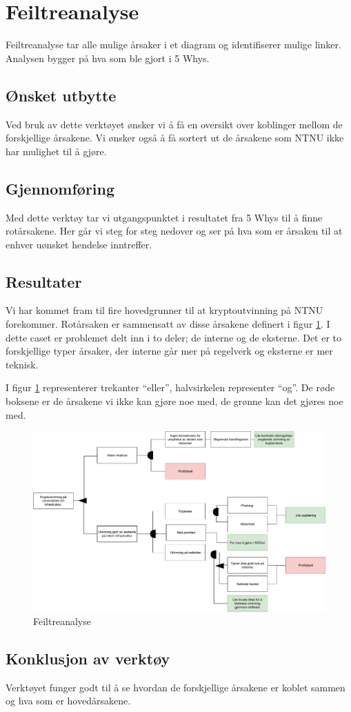 \section{Feiltreanalyse}
Feiltreanalyse tar alle mulige årsaker i et diagram og identifiserer mulige linker. Analysen bygger på hva som ble gjort i 5 Whys. 

\subsection{Ønsket utbytte}
Ved bruk av dette verktøyet ønsker vi å få en oversikt over koblinger mellom de forskjellige årsakene. Vi ønsker også å få sortert ut de årsakene som NTNU ikke har mulighet til å gjøre.

\subsection{Gjennomføring}
Med dette verktøy tar vi utgangspunktet i resultatet fra 5 Whys til å finne rotårsakene. Her går vi steg for steg nedover og ser på hva som er årsaken til at enhver uønsket hendelse inntreffer.

\subsection{Resultater}
Vi har kommet fram til fire hovedgrunner til at kryptoutvinning på NTNU forekommer. Rotårsaken er sammensatt av disse årsakene definert i figur \ref{fig:feil_tre_analyse}. I dette caset er problemet delt inn i to deler; de interne og de eksterne. Det er to forskjellige typer årsaker, der interne går mer på regelverk og eksterne er mer teknisk.          

I figur \ref{fig:feil_tre_analyse} representerer trekanter ``eller'', halvsirkelen representer ``og''. De røde boksene er de årsakene vi ikke kan gjøre noe med, de grønne kan det gjøres noe med.
 \begin{figure}[H]
    \centering
    \includegraphics[scale=0.45]{case_3/bilder/feil_tre_analyse.pdf}
    \caption[Feiltreanalyse]{Feiltreanalyse}
    \label{fig:feil_tre_analyse}
\end{figure}

\subsection{Konklusjon av verktøy}
Verktøyet funger godt til å se hvordan de forskjellige årsakene er koblet sammen og hva som er hovedårsakene.